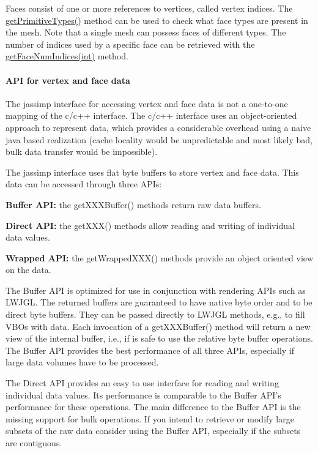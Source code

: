 Faces consist of one or more references to vertices, called vertex indices. The \hyperlink{classjassimp_1_1_ai_mesh_a507049804efb042d6262ff27880705f0}{get\+Primitive\+Types()} method can be used to check what face types are present in the mesh. Note that a single mesh can possess faces of different types. The number of indices used by a specific face can be retrieved with the \hyperlink{classjassimp_1_1_ai_mesh_a34ea13053c044aa612ad94cdf74b6395}{get\+Face\+Num\+Indices(int)} method.

\paragraph*{A\+P\+I for vertex and face data}

The jassimp interface for accessing vertex and face data is not a one-\/to-\/one mapping of the c/c++ interface. The c/c++ interface uses an object-\/oriented approach to represent data, which provides a considerable overhead using a naive java based realization (cache locality would be unpredictable and most likely bad, bulk data transfer would be impossible). 

The jassimp interface uses flat byte buffers to store vertex and face data. This data can be accessed through three A\+P\+Is\+: 
\begin{DoxyItemize}
\item {\bfseries Buffer A\+P\+I\+:} the {\ttfamily get\+X\+X\+X\+Buffer()} methods return raw data buffers. 
\item {\bfseries Direct A\+P\+I\+:} the {\ttfamily get\+X\+X\+X()} methods allow reading and writing of individual data values. 
\item {\bfseries Wrapped A\+P\+I\+:} the {\ttfamily get\+Wrapped\+X\+X\+X()} methods provide an object oriented view on the data. 
\end{DoxyItemize}

The Buffer A\+P\+I is optimized for use in conjunction with rendering A\+P\+Is such as L\+W\+J\+G\+L. The returned buffers are guaranteed to have native byte order and to be direct byte buffers. They can be passed directly to L\+W\+J\+G\+L methods, e.\+g., to fill V\+B\+Os with data. Each invocation of a {\ttfamily get\+X\+X\+X\+Buffer()} method will return a new view of the internal buffer, i.\+e., if is safe to use the relative byte buffer operations. The Buffer A\+P\+I provides the best performance of all three A\+P\+Is, especially if large data volumes have to be processed.

The Direct A\+P\+I provides an easy to use interface for reading and writing individual data values. Its performance is comparable to the Buffer A\+P\+I's performance for these operations. The main difference to the Buffer A\+P\+I is the missing support for bulk operations. If you intend to retrieve or modify large subsets of the raw data consider using the Buffer A\+P\+I, especially if the subsets are contiguous. 

